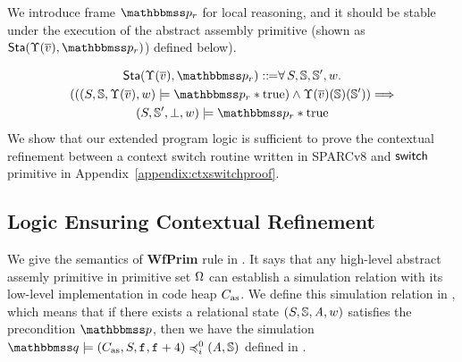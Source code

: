 We introduce frame $\relastP_r$ for local reasoning, 
and it should be stable under the execution 
of the abstract assembly primitive 
(shown as $\Sta(\hprim(\args{\val}), \relastP_r)$)
defined below). 

{\small
\begin{multline*}
    \Sta(\hprim(\args{\val}), \relastP_r) 
    \define 
    \forall \, \state, \hpstate, \hpstate', \word. \\ 
    ((\asrtmodel{(\state, \hpstate, \hprim(\args{\val}), \word)}
        {\relastP_r\sepstar\atrue}) 
    \land
    \hprim(\args{\val})(\hpstate)(\hpstate'))\imp \\
    \asrtmodel{(\state, \hpstate', \primdone, \word)}
        {\relastP_r\sepstar\atrue} 
\end{multline*}
}
We show that our extended program logic is sufficient 
to prove the contextual refinement between 
a context switch routine written in SPARCv8
and $\mathsf{switch}$ primitive 
in Appendix~\ref{appendix:ctxswitchproof}. 
\subsection{Logic Ensuring Contextual Refinement}
\label{subsec:logic-ensuring-ctxrefinement}

We give the semantics of \textbf{WfPrim} rule in 
\Def{\ref{def:wdprim-sem}}. 
It says that any high-level abstract assemly primitive 
in primitive set $\Omega$ can 
establish a simulation relation with its low-level 
implementation in code heap $C_{\text{as}}$. We define this 
simulation relation in \Def{\ref{def:sim-impl-prim}}, 
which means that if there 
exists a relational state $(S, \mathbb{S}, \textit{A}, w)$ 
satisfies the precondition $\relastP$, then we have 
the simulation 
$\simFunctionSt{\relastQ}{(\asmimp, \state, \lab{}, \lab{} + 4)}
    {i}{0}{(\primcom, \hpstate)}$ defined in 
\Def{\ref{def:sim-imp-prim-state}}. 

